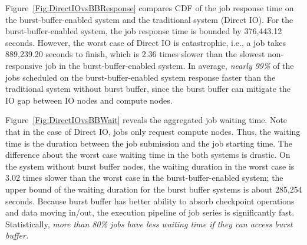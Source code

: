 
Figure~\ref{Fig:DirectIOvsBBResponse} compares CDF of the job response
time on the burst-buffer-enabled system and the traditional system (Direct IO).
For the burst-buffer-enabled system, the job response time is bounded by 376,443.12 seconds.
However, the worst case of Direct IO is catastrophic, i.e., a job takes 889,239.20 seconds to finish, which is 2.36 times slower than the slowest non-responsive job
in the burst-buffer-enabled system.
In average, \textit{nearly 99\%} of the jobs scheduled on the burst-buffer-enabled system
response faster than the traditional system without burst buffer, since the burst buffer can mitigate the IO gap between IO nodes and compute nodes.



Figure~\ref{Fig:DirectIOvsBBWait} reveals the aggregated job waiting time.
Note that in the case of Direct IO, jobs only request compute nodes.
Thus, the waiting time is the duration between the job submission and the job starting time.
The difference about the worst case waiting time in the both systems is drastic.
On the system without burst buffer nodes, the waiting duration in the worst case is 3.02 times
slower than the worst case in the burst-buffer-enabled system;
the upper bound of the waiting duration for the burst buffer systems is about 285,254 seconds.
Because burst buffer has better ability to absorb checkpoint operations and data moving in/out,
the execution pipeline of job series is significantly fast.
Statistically, \textit{more than 80\% jobs have less waiting time if they can access burst buffer.}

